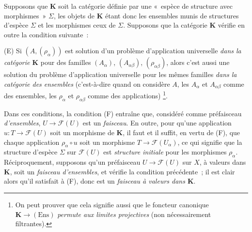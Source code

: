 \begin{env}[3.1.3]
\label{0.3.1.3-fr}
Supposons que $\mathbf{K}$ soit la catégorie définie par une «~espèce de
structure avec morphismes~» $\Sigma$, les objets de $\mathbf{K}$ étant donc
les ensembles munis de structures d'espèce $\Sigma$ et les morphismes ceux de
$\Sigma$. Supposons que la catégorie $\mathbf{K}$ vérifie en outre la
condition suivante~:

\smallskip
\noindent
\textup{(E)} Si $(A,(\rho_\alpha))$ est solution d'un problème d'application
universelle \emph{dans la catégorie $\mathbf{K}$} pour des familles
$(A_\alpha)$, $(A_{\alpha\beta})$, $(\rho_{\alpha\beta})$, alors c'est aussi
une solution du problème d'application universelle pour les mêmes familles
\emph{dans la catégorie des ensembles} (c'est-à-dire quand on considère $A$,
les $A_\alpha$ et $A_{\alpha\beta}$ comme des ensembles, les $\rho_\alpha$ et
$\rho_{\alpha\beta}$ comme des applications)%
\footnote{On peut prouver que cela signifie aussi que le foncteur canonique
$\mathbf{K}\to(\mathrm{Ens})$ \emph{permute aux limites projectives} (non
nécessairement filtrantes).}.

Dans ces conditions, la condition (F) entraîne que, considéré comme
préfaisceau \emph{d'ensembles}, $U\to\mathcal{F}(U)$ est un \emph{faisceau}.
En outre, pour qu'une application $u:T\to\mathcal{F}(U)$ soit un morphisme de
$\mathbf{K}$, il faut et il suffit, en vertu de (F), que chaque application
$\rho_\alpha\circ u$ soit un morphisme $T\to\mathcal{F}(U_\alpha)$, ce qui
signifie que la structure d'espèce $\Sigma$ sur $\mathcal{F}(U)$ est
\emph{structure initiale} pour les morphismes $\rho_\alpha$. Réciproquement,
supposons qu'un préfaisceau $U\to\mathcal{F}(U)$ sur $X$, à valeurs dans
$\mathbf{K}$, soit un \emph{faisceau d'ensembles}, et vérifie la condition
précédente~; il est clair alors qu'il satisfait à (F), donc est un
\emph{faisceau à valeurs dans $\mathbf{K}$}.
\end{env}

